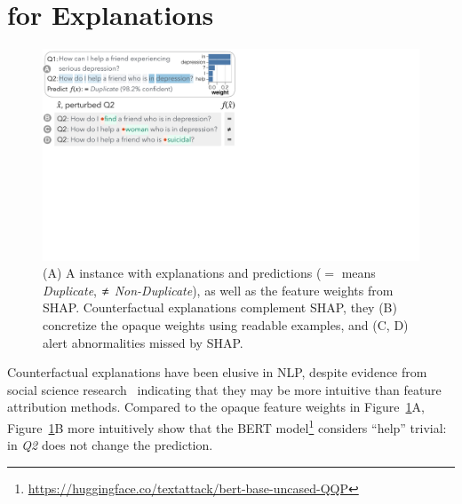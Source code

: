 
\newcommand{\fwone}[1]{\colbox{cfwone}{#1}\xspace}
\newcommand{\fwtwo}[1]{\colbox{cfwtwo}{#1}\xspace}
\newcommand{\fwthree}[1]{\colbox{cfwthree}{#1}\xspace}
\newcommand{\fwfour}[1]{\colbox{cfwfour}{#1}\xspace}

\newcommand{\fexp}[2]{\texttt{[{\color{darkgray}{#1:#2}}]}\xspace}
\newcommand{\fexptag}[1]{\fexp{TAG}{#1}}
\newcommand{\fexpfrom}[1]{\fexp{FROM}{#1}}
\newcommand{\fexpto}[1]{\fexp{TO}{#1}}
\newcommand{\fexptemp}[1]{\fexp{TEMP}{#1}}


\section{\sysname for Explanations}
\label{sec:app_explain}




\begin{figure}[t]
\centering
\includegraphics[trim={0 21cm 33cm 0cm},clip,width=1\columnwidth]{figures/explanation_v2.pdf}
\vspace{-15pt}
\caption{
(A) A \qqp instance with explanations and predictions ($\mathbf{=}$ means \emph{Duplicate}, $\mathbf{\not\eq}$ \emph{Non-Duplicate}), as well as the feature weights from SHAP.
Counterfactual explanations complement SHAP, \ie they (B) concretize the opaque weights using readable examples, and (C, D) alert abnormalities missed by SHAP.
}
\vspace{-10pt}
\label{fig:explanation}
\end{figure}

Counterfactual explanations have been elusive in NLP, despite evidence from social science research~\cite{miller} indicating that they may be more intuitive than feature attribution methods. 
Compared to the opaque feature weights in Figure~\ref{fig:explanation}A, Figure~\ref{fig:explanation}B more intuitively show that the BERT \qqp model\footnote{\url{https://huggingface.co/textattack/bert-base-uncased-QQP}} considers ``help'' trivial: 
 in \emph{Q2} does not change the prediction.

